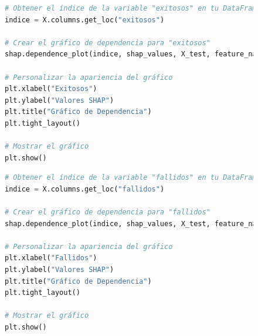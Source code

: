 \begin{figure}[H]
    \centering
    \begin{minipage}{0.48\textwidth}
        \begin{lstlisting}[language=Python, caption=Grafico de dependencia exitosos, label=lst:grafDepExitosos]
# Obtener el índice de la variable "exitosos" en tu DataFrame
indice = X.columns.get_loc("exitosos")

# Crear el gráfico de dependencia para "exitosos"
shap.dependence_plot(indice, shap_values, X_test, feature_names=X.columns, show=False)

# Personalizar la apariencia del gráfico
plt.xlabel("Exitosos")
plt.ylabel("Valores SHAP")
plt.title("Gráfico de Dependencia")
plt.tight_layout()

# Mostrar el gráfico
plt.show()
        \end{lstlisting}
    \end{minipage}
    \hfill
    \begin{minipage}{0.48\textwidth}
        \begin{lstlisting}[language=Python, caption=Grafico de dependencia fallidos, label=lst:grafDepFallidos]
# Obtener el índice de la variable "fallidos" en tu DataFrame
indice = X.columns.get_loc("fallidos")

# Crear el gráfico de dependencia para "fallidos"
shap.dependence_plot(indice, shap_values, X_test, feature_names=X.columns, show=False)

# Personalizar la apariencia del gráfico
plt.xlabel("Fallidos")
plt.ylabel("Valores SHAP")
plt.title("Gráfico de Dependencia")
plt.tight_layout()

# Mostrar el gráfico
plt.show()
        \end{lstlisting}
    \end{minipage}
\end{figure}

